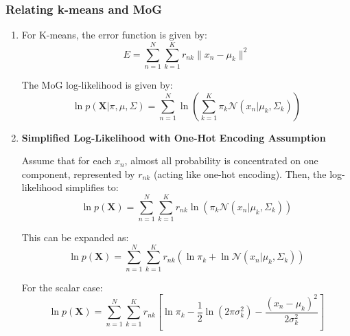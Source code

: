 \subsubsection{Relating k-means and MoG}
\begin{intuition}
    \begin{enumerate}
        \item For K-means, the error function is given by:
        \[
        E = \sum_{n=1}^{N} \sum_{k=1}^{K} r_{nk} \| x_n - \mu_k \|^2
        \]
    
        The MoG log-likelihood is given by:
        \[
        \ln p(\mathbf{X} | \pi, \mu, \Sigma) = \sum_{n=1}^{N} \ln \left( \sum_{k=1}^{K} \pi_k \mathcal{N}(x_n | \mu_k, \Sigma_k) \right)
        \]
    
        \item \textbf{Simplified Log-Likelihood with One-Hot Encoding Assumption}
    
        Assume that for each \( x_n \), almost all probability is concentrated on one component, represented by \( r_{nk} \) (acting like one-hot encoding). Then, the log-likelihood simplifies to:
        \[
        \ln p(\mathbf{X}) = \sum_{n=1}^{N} \sum_{k=1}^{K} r_{nk} \ln \left( \pi_k \mathcal{N}(x_n | \mu_k, \Sigma_k) \right)
        \]
    
        This can be expanded as:
        \[
        \ln p(\mathbf{X}) = \sum_{n=1}^{N} \sum_{k=1}^{K} r_{nk} \left( \ln \pi_k + \ln \mathcal{N}(x_n | \mu_k, \Sigma_k) \right)
        \]
    
        For the scalar case:
        \[
        \ln p(\mathbf{X}) = \sum_{n=1}^{N} \sum_{k=1}^{K} r_{nk} \left[ \ln \pi_k - \frac{1}{2} \ln(2\pi \sigma_k^2) - \frac{(x_n - \mu_k)^2}{2 \sigma_k^2} \right]
        \]
    \end{enumerate}
\end{intuition}

